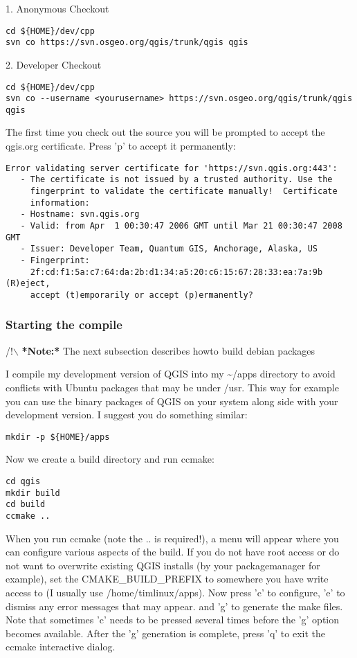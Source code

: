 1. Anonymous Checkout

\begin{verbatim}
cd ${HOME}/dev/cpp 
svn co https://svn.osgeo.org/qgis/trunk/qgis qgis
\end{verbatim}

2. Developer Checkout

\begin{verbatim}
cd ${HOME}/dev/cpp 
svn co --username <yourusername> https://svn.osgeo.org/qgis/trunk/qgis qgis 
\end{verbatim}

The first time you check out the source you will be prompted to accept the
qgis.org certificate. Press 'p' to accept it permanently:

\begin{verbatim}
Error validating server certificate for 'https://svn.qgis.org:443':
   - The certificate is not issued by a trusted authority. Use the
     fingerprint to validate the certificate manually!  Certificate
     information:
   - Hostname: svn.qgis.org
   - Valid: from Apr  1 00:30:47 2006 GMT until Mar 21 00:30:47 2008 GMT
   - Issuer: Developer Team, Quantum GIS, Anchorage, Alaska, US
   - Fingerprint:
     2f:cd:f1:5a:c7:64:da:2b:d1:34:a5:20:c6:15:67:28:33:ea:7a:9b (R)eject,
     accept (t)emporarily or accept (p)ermanently?  
\end{verbatim}

\hypertarget{toc51}{}
\subsubsection{Starting the compile}
/!$\backslash$ \textbf{*Note:*} The next subsection describes howto build debian packages

I compile my development version of QGIS into my \~{}/apps directory to avoid
conflicts with Ubuntu packages that may be under /usr. This way for example
you can use the binary packages of QGIS on your system along side with your
development version. I suggest you do something similar:

\begin{verbatim}
mkdir -p ${HOME}/apps 
\end{verbatim}

Now we create a build directory and run ccmake:

\begin{verbatim}
cd qgis
mkdir build
cd build
ccmake ..
\end{verbatim}

When you run ccmake (note the .. is required!), a menu will appear where 
you can configure various aspects of the build. If you do not have root
access or do not want to overwrite existing QGIS installs (by your
packagemanager for example), set the CMAKE\_BUILD\_PREFIX to somewhere you
have write access to (I usually use /home/timlinux/apps). Now press
'c' to configure, 'e' to dismiss any error messages that may appear.
and 'g' to generate the make files. Note that sometimes 'c' needs to 
be pressed several times before the 'g' option becomes available.
After the 'g' generation is complete, press 'q' to exit the ccmake 
interactive dialog.

